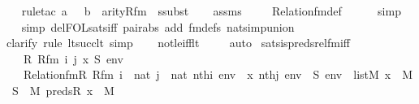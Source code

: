 \begin{isabellebody}
\ \ \isamarkupfalse%
{\isacharparenleft}{\kern0pt}rule{\isacharunderscore}{\kern0pt}tac\ a{\isacharequal}{\kern0pt}{}\ \ \ b\ {\isacharequal}{\kern0pt}\ {\isachardoublequoteopen}arity{\isacharparenleft}{\kern0pt}Rfm{\isacharparenright}{\kern0pt}{\isachardoublequoteclose}\ \ ssubst{\isacharparenright}{\kern0pt}\isanewline
\ \ \isamarkupfalse%
\ assms\ \isanewline
\ \ \isamarkupfalse%
\ Relation{\isacharunderscore}{\kern0pt}fm{\isacharunderscore}{\kern0pt}def\ \isanewline
\ \ \ \isamarkupfalse%
\ simp\isanewline
\ \ \isamarkupfalse%
{\isacharparenleft}{\kern0pt}simp\ del{\isacharcolon}{\kern0pt}FOL{\isacharunderscore}{\kern0pt}sats{\isacharunderscore}{\kern0pt}iff\ pair{\isacharunderscore}{\kern0pt}abs\ add{\isacharcolon}{\kern0pt}\ fm{\isacharunderscore}{\kern0pt}defs\ nat{\isacharunderscore}{\kern0pt}simp{\isacharunderscore}{\kern0pt}union{\isacharparenright}{\kern0pt}\ \ \isanewline
\ \ \isamarkupfalse%
{\isacharparenleft}{\kern0pt}clarify{\isacharcomma}{\kern0pt}\ rule\ lt{\isacharunderscore}{\kern0pt}succ{\isacharunderscore}{\kern0pt}lt{\isacharcomma}{\kern0pt}\ simp{\isacharparenright}{\kern0pt}\isanewline
\ \ \isamarkupfalse%
\ not{\isacharunderscore}{\kern0pt}le{\isacharunderscore}{\kern0pt}iff{\isacharunderscore}{\kern0pt}lt\ \isanewline
\ \ \isamarkupfalse%
\ auto%
\endisatagproof
{\isafoldproof}%
%
\isadelimproof
\isanewline
%
\endisadelimproof
\isanewline
{}\isamarkupfalse%
\ sats{\isacharunderscore}{\kern0pt}is{\isacharunderscore}{\kern0pt}preds{\isacharunderscore}{\kern0pt}rel{\isacharunderscore}{\kern0pt}fm{\isacharunderscore}{\kern0pt}iff\ {\isacharcolon}{\kern0pt}\isanewline
\ \ \ R\ Rfm\ i\ j\ x\ S\ env\isanewline
\ \ \ {\isachardoublequoteopen}Relation{\isacharunderscore}{\kern0pt}fm{\isacharparenleft}{\kern0pt}R{\isacharcomma}{\kern0pt}\ Rfm{\isacharparenright}{\kern0pt}{\isachardoublequoteclose}\ {\isachardoublequoteopen}i\ {\isasymin}\ nat{\isachardoublequoteclose}\ {\isachardoublequoteopen}j\ {\isasymin}\ nat{\isachardoublequoteclose}\ {\isachardoublequoteopen}nth{\isacharparenleft}{\kern0pt}i{\isacharcomma}{\kern0pt}\ env{\isacharparenright}{\kern0pt}\ {\isacharequal}{\kern0pt}\ x{\isachardoublequoteclose}\ {\isachardoublequoteopen}nth{\isacharparenleft}{\kern0pt}j{\isacharcomma}{\kern0pt}\ env{\isacharparenright}{\kern0pt}\ {\isacharequal}{\kern0pt}\ S{\isachardoublequoteclose}\ {\isachardoublequoteopen}env\ {\isasymin}\ list{\isacharparenleft}{\kern0pt}M{\isacharparenright}{\kern0pt}{\isachardoublequoteclose}\ {\isachardoublequoteopen}x\ {\isasymin}\ M{\isachardoublequoteclose}\ {\isachardoublequoteopen}S\ {\isasymin}\ M{\isachardoublequoteclose}\ {\isachardoublequoteopen}preds{\isacharparenleft}{\kern0pt}R{\isacharcomma}{\kern0pt}\ x{\isacharparenright}{\kern0pt}\ {\isasymin}\ M{\isachardoublequoteclose}\isanewline

\end{isabellebody}
